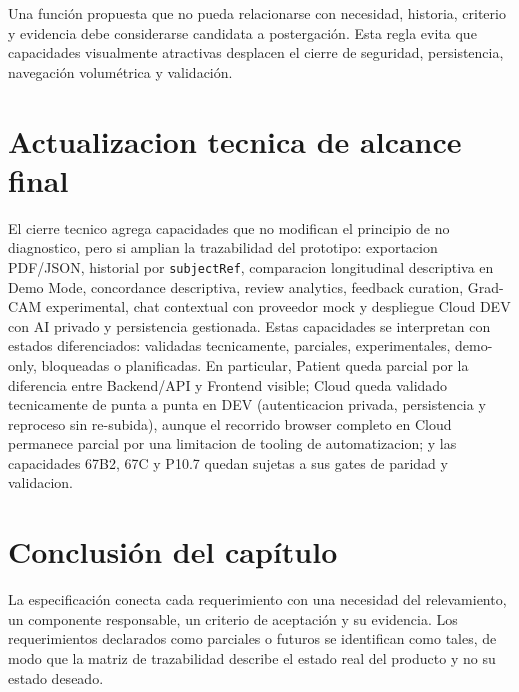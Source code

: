 Una función propuesta que no pueda relacionarse con necesidad, historia, criterio y evidencia debe considerarse candidata a postergación. Esta regla evita que capacidades visualmente atractivas desplacen el cierre de seguridad, persistencia, navegación volumétrica y validación.


\section{Actualizacion tecnica de alcance final}

El cierre tecnico agrega capacidades que no modifican el principio de no diagnostico, pero si amplian la trazabilidad del prototipo: exportacion PDF/JSON, historial por \texttt{subjectRef}, comparacion longitudinal descriptiva en Demo Mode, concordance descriptiva, review analytics, feedback curation, Grad-CAM experimental, chat contextual con proveedor mock y despliegue Cloud DEV con AI privado y persistencia gestionada. Estas capacidades se interpretan con estados diferenciados: validadas tecnicamente, parciales, experimentales, demo-only, bloqueadas o planificadas. En particular, Patient queda parcial por la diferencia entre Backend/API y Frontend visible; Cloud queda validado tecnicamente de punta a punta en DEV (autenticacion privada, persistencia y reproceso sin re-subida), aunque el recorrido browser completo en Cloud permanece parcial por una limitacion de tooling de automatizacion; y las capacidades 67B2, 67C y P10.7 quedan sujetas a sus gates de paridad y validacion.
\section{Conclusión del capítulo}

La especificación conecta cada requerimiento con una necesidad del relevamiento, un componente responsable, un criterio de aceptación y su evidencia. Los requerimientos declarados como parciales o futuros se identifican como tales, de modo que la matriz de trazabilidad describe el estado real del producto y no su estado deseado.
